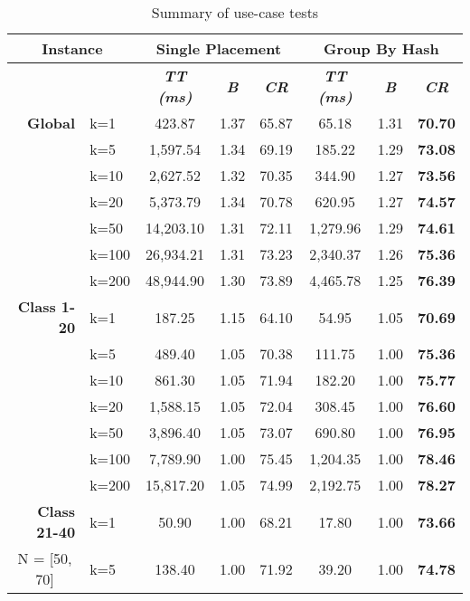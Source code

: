 \begin{table}[htbp]
    \centering
    \caption{Summary of use-case tests}
    \begin{tabular}{|l|l|c|c|c|c|c|c|}
    \hline
    \multicolumn{ 2}{|c|}{\textbf{Instance}} & \multicolumn{ 3}{c|}{\textbf{Single Placement}} & \multicolumn{ 3}{c|}{\textbf{Group By Hash}} \\ \hline
    \multicolumn{ 2}{|l|}{} & \textbf{\textit{TT (ms)}} & \textbf{\textit{B}} & \textbf{\textit{CR}} & \textbf{\textit{TT (ms)}} & \textbf{\textit{B}} & \textbf{\textit{CR}} \\ \hline
    \multicolumn{1}{|r|}{\textbf{Global}} & k=1 & 423.87 & 1.37 & 65.87 & 65.18 & 1.31 & \textbf{70.70} \\ 
     & k=5 & 1,597.54 & 1.34 & 69.19 & 185.22 & 1.29 & \textbf{73.08} \\ 
     & k=10 & 2,627.52 & 1.32 & 70.35 & 344.90 & 1.27 & \textbf{73.56} \\ 
     & k=20 & 5,373.79 & 1.34 & 70.78 & 620.95 & 1.27 & \textbf{74.57} \\ 
     & k=50 & 14,203.10 & 1.31 & 72.11 & 1,279.96 & 1.29 & \textbf{74.61} \\ 
     & k=100 & 26,934.21 & 1.31 & 73.23 & 2,340.37 & 1.26 & \textbf{75.36} \\ 
     & k=200 & 48,944.90 & 1.30 & 73.89 & 4,465.78 & 1.25 & \textbf{76.39} \\ \hline
    \multicolumn{1}{|r|}{\textbf{Class 1-20}} & k=1 & 187.25 & 1.15 & 64.10 & 54.95 & 1.05 & \textbf{70.69} \\ 
     & k=5 & 489.40 & 1.05 & 70.38 & 111.75 & 1.00 & \textbf{75.36} \\ 
     & k=10 & 861.30 & 1.05 & 71.94 & 182.20 & 1.00 & \textbf{75.77} \\ 
     & k=20 & 1,588.15 & 1.05 & 72.04 & 308.45 & 1.00 & \textbf{76.60} \\ 
     & k=50 & 3,896.40 & 1.05 & 73.07 & 690.80 & 1.00 & \textbf{76.95} \\ 
     & k=100 & 7,789.90 & 1.00 & 75.45 & 1,204.35 & 1.00 & \textbf{78.46} \\ 
     & k=200 & 15,817.20 & 1.05 & 74.99 & 2,192.75 & 1.00 & \textbf{78.27} \\ \hline
    \multicolumn{1}{|r|}{\textbf{Class 21-40}} & k=1 & 50.90 & 1.00 & 68.21 & 17.80 & 1.00 & \textbf{73.66} \\ 
    \multicolumn{1}{|c|}{N = [50, 70]} & k=5 & 138.40 & 1.00 & 71.92 & 39.20 & 1.00 & \textbf{74.78} \\ 

\end{tabular}
\end{table}
